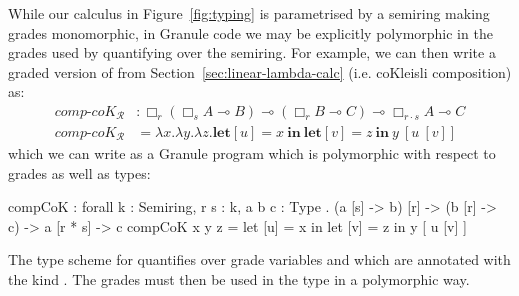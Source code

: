 \begin{example}
\label{example:graded-granule}
While our calculus in Figure~\ref{fig:typing} is parametrised by a semiring
making grades monomorphic, in Granule code we may be explicitly polymorphic in
the grades used by quantifying over the semiring. For example, we can then write
a graded version of  from Section~\ref{sec:linear-lambda-calc}
(i.e. coKleisli composition) as: 
\begin{align*}
\textit{comp-}\textit{coK}_{\mathcal{R}} & : \Box_r (\Box_s A \multimap B) \multimap (\Box_r B \multimap C) \multimap \Box_{r \cdot s} A \multimap C \\
\textit{comp-}\textit{coK}_{\mathcal{R}} & = \lambda x . \lambda y . \lambda z . \textbf{let}[u] = x\ \textbf{in}\ \textbf{let}[v] = z\ \textbf{in}\ y\ [u\ [ v ] ]
\end{align*}
which we can write as a Granule program which is polymorphic with respect to
grades as well as types:
\begin{granule}
compCoK : forall {k : Semiring, r s : k, a b c : Type} 
     . (a [s] -> b) [r] 
     -> (b [r] -> c) 
     -> a [r * s] 
     -> c
compCoK x y z = let [u] = x in let [v] = z in y  [ u [v] ]
\end{granule}
The type scheme for  quantifies over grade variables 
and  which are annotated with the kind . The grades
must then be used in the type in a polymorphic way.
\end{example}

